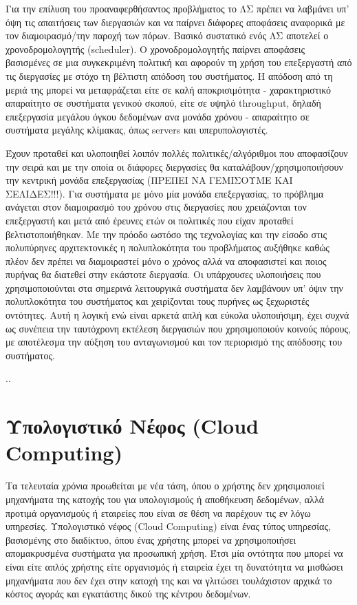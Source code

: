 Για την επίλυση του προαναφερθήσαντος προβλήματος το ΛΣ πρέπει να λαβμάνει υπ'
όψη τις απαιτήσεις των διεργασιών και να παίρνει διάφορες αποφάσεις αναφορικά με
τον διαμοιρασμό/την παροχή των πόρων. Βασικό συστατικό ενός ΛΣ αποτελεί ο
χρονοδρομολογητής (scheduler). Ο χρονοδρομολογητής παίρνει αποφάσεις βασισμένες
σε μια συγκεκριμένη πολιτική και αφορούν τη χρήση του επεξεργαστή από τις
διεργασίες με στόχο τη βέλτιστη απόδοση του συστήματος. Η απόδοση από τη μεριά
της μπορεί να μεταφράζεται είτε σε καλή αποκρισιμότητα - χαρακτηριστικό
απαραίτητο σε συστήματα γενικού σκοπού, είτε σε υψηλό throughput, δηλαδή
επεξεργασία μεγάλου όγκου δεδομένων ανα μονάδα χρόνου - απαραίτητο σε συστήματα
μεγάλης κλίμακας, όπως servers και υπερυπολογιστές.

Έχουν προταθεί και υλοποιηθεί λοιπόν πολλές πολιτικές/αλγόριθμοι που αποφασίζουν
την σειρά και με την οποία οι διάφορες διεργασίες θα καταλάβουν/χρησιμοποιήσουν
την κεντρική μονάδα επεξεργασίας (ΠΡΕΠΕΙ ΝΑ ΓΕΜΙΣΟΥΜΕ ΚΑΙ ΣΕΛΙΔΕΣ!!!). Για
συστήματα με μόνο μία μονάδα επεξεργασίας, το πρόβλημα ανάγεται στον διαμοιρασμό
του χρόνου στις διεργασίες που χρειάζονται τον επεξεργαστή και μετά από έρευνες
ετών οι πολιτικές που είχαν προταθεί βελτιστοποιήθηκαν. Με την πρόοδο
ωστόσο της τεχνολογίας και την είσοδο στις πολυπύρηνες αρχιτεκτονικές η
πολυπλοκότητα του προβλήματος αυξήθηκε καθώς πλέον δεν πρέπει να διαμοιραστεί
μόνο ο χρόνος αλλά να αποφασιστεί και ποιος πυρήνας θα διατεθεί στην εκάστοτε
διεργασία. Οι υπάρχουσες υλοποιήσεις που χρησιμοποιούνται στα σημερινά λειτουργικά
συστήματα δεν λαμβάνουν υπ' όψιν την πολυπλοκότητα του συστήματος και
χειρίζονται τους πυρήνες ως ξεχωριστές οντότητες. Αυτή η λογική ενώ είναι αρκετά
απλή και εύκολα υλοποιήσιμη, έχει συχνά ως συνέπεια την ταυτόχρονη εκτέλεση
διεργασιών που χρησιμοποιούν κοινούς πόρους, με αποτέλεσμα την αύξηση του
ανταγωνισμού και τον περιορισμό της απόδοσης του συστήματος.

..
\section{Υπολογιστικό Νέφος (Cloud Computing)}
Τα τελευταία χρόνια προωθείται με νέα τάση, όπου ο χρήστης δεν χρησιμοποιεί
μηχανήματα της κατοχής του για υπολογισμούς ή αποθήκευση δεδομένων, αλλά προτιμά
οργανισμούς ή εταιρείες που είναι σε θέση να παρέχουν τις εν λόγω υπηρεσίες.
Υπολογιστικό νέφος (Cloud Computing) είναι ένας τύπος υπηρεσίας, βασισμένης στο
διαδίκτυο, όπου ένας χρήστης μπορεί να χρησιμοποιήσει απομακρυσμένα συστήματα
για προσωπική χρήση. Έτσι μία οντότητα που μπορεί να είναι είτε απλός χρήστης είτε
οργανισμός ή εταιρεία έχει τη δυνατότητα να μισθώσει μηχανήματα που δεν έχει
στην κατοχή της και να γλιτώσει τουλάχιστον αρχικά το κόστος αγοράς και
εγκατάστης δικού της κέντρου δεδομένων. 

